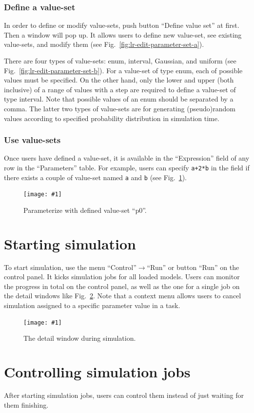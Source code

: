 \documentclass[a4paper,10pt]{report}
\newcommand\FigureOfImage[2]{\begin{figure}[h]
  \centering
  \texttt{[image: \#1]}
  \caption{#2}\label{fig:#1}
\end{figure}}
\begin{document}
\subsubsection{Define a value-set}
In order to define or modify value-sets, push button ``Define value set'' at
first. Then a window will pop up. It allows users to define new value-set,
see existing value-sets, and modify them (see Fig.~\ref{fig:lr-edit-parameter-set-a}).

There are four types of value-sets: enum, interval, Gaussian, and uniform
(see Fig.~\ref{fig:lr-edit-parameter-set-b}).
For a value-set of type enum, each of possible values must be specified.
On the other hand, only the lower and upper (both inclusive) of a range
of values with a step are required to define a value-set of type interval.
Note that possible values of an enum should be separated by a comma.
The latter two types of value-sets are for generating (pseudo)random values
according to specified probability distribution in simulation time.

\subsubsection{Use value-sets}
Once users have defined a value-set, it is available in the ``Expression''
field of any row in the ``Parameters'' table. For example, users can specify
{\tt a+2*b} in the field if there exists a couple of value-set named {\tt a} and
{\tt b} (see Fig.~\ref{fig:lr-parameter-set}).
\FigureOfImage{lr-parameter-set}{Parameterize with defined value-set ``p0''.}

\section{Starting simulation}
To start simulation, use the menu ``Control''$\rightarrow$``Run'' or button
``Run'' on the control panel. It kicks simulation jobs for all loaded models.
Users can monitor the progress in total on the control panel, as well as the
one for a single job on the detail windows like Fig.~\ref{fig:lr-detail}.
Note that a context menu allows users to cancel simulation assigned to a
specific parameter value in a task.
\FigureOfImage{lr-detail}{The detail window during simulation.}

\section{Controlling simulation jobs}
After starting simulation jobs, users can control them instead of just waiting
for them finishing.
\end{document}
